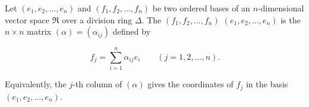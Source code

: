 Let $(e_1, e_2, \ldots, e_n)$ and $(f_1, f_2, \ldots, f_n)$ be two ordered bases of an $n$-dimensional vector space $\Re$ over a division ring $\Delta$. The  $(f_1, f_2, \ldots, f_n)$  $(e_1, e_2, \ldots, e_n)$ is the $n \times n$ matrix $(\alpha) = (\alpha_{ij})$ defined by

$$f_j = \sum_{i=1}^{n} \alpha_{ij} e_i \qquad (j = 1, 2, \ldots, n).$$

Equivalently, the $j$-th column of $(\alpha)$ gives the coordinates of $f_j$ in the basis $(e_1, e_2, \ldots, e_n)$.
